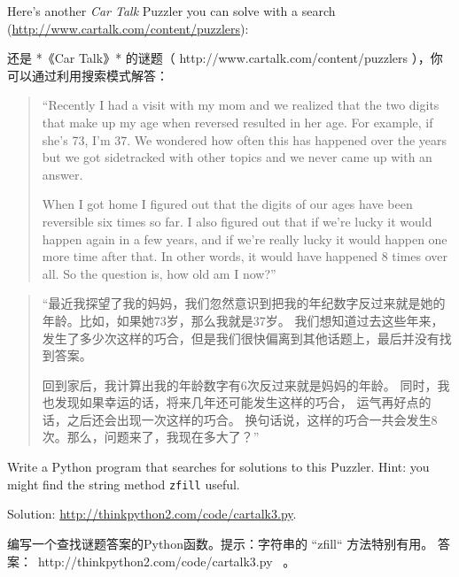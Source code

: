 \begin{exercise}
Here's another {\em Car Talk} Puzzler you can solve with a
search (\url{http://www.cartalk.com/content/puzzlers}):

还是 *《Car Talk》* 的谜题（ http://www.cartalk.com/content/puzzlers ），你可以通过利用搜索模式解答：
    

\begin{quote}
``Recently I had a visit with my mom and we realized that
the two digits that make up my age when reversed resulted in her
age. For example, if she's 73, I'm 37. We wondered how often this has
happened over the years but we got sidetracked with other topics and
we never came up with an answer.

When I got home I figured out that the digits of our ages have been
reversible six times so far. I also figured out that if we're lucky it
would happen again in a few years, and if we're really lucky it would
happen one more time after that. In other words, it would have
happened 8 times over all. So the question is, how old am I now?''

\end{quote}

\begin{quote}

    ``最近我探望了我的妈妈，我们忽然意识到把我的年纪数字反过来就是她的年龄。比如，如果她73岁，那么我就是37岁。
    我们想知道过去这些年来，发生了多少次这样的巧合，但是我们很快偏离到其他话题上，最后并没有找到答案。

    回到家后，我计算出我的年龄数字有6次反过来就是妈妈的年龄。
    同时，我也发现如果幸运的话，将来几年还可能发生这样的巧合，
    运气再好点的话，之后还会出现一次这样的巧合。
    换句话说，这样的巧合一共会发生8次。那么，问题来了，我现在多大了？''

\end{quote}

Write a Python program that searches for solutions to this Puzzler.
Hint: you might find the string method {\tt zfill} useful.

Solution: \url{http://thinkpython2.com/code/cartalk3.py}.

编写一个查找谜题答案的Python函数。提示：字符串的 ``zfill`` 方法特别有用。
答案：\ http://thinkpython2.com/code/cartalk3.py \ 。


\end{exercise}

